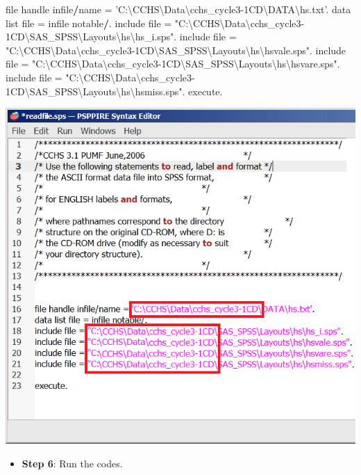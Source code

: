 \documentclass[
]{book}
\newenvironment{Shaded}{\begin{snugshade}}{\end{snugshade}}
\newcommand{\NormalTok}[1]{#1}
\newcommand{\OperatorTok}[1]{\textcolor[rgb]{0.81,0.36,0.00}{\textbf{#1}}}
\newcommand{\StringTok}[1]{\textcolor[rgb]{0.31,0.60,0.02}{#1}}
\providecommand{\tightlist}{%
  \setlength{\itemsep}{0pt}\setlength{\parskip}{0pt}}
\begin{document}
\begin{Shaded}
\begin{Highlighting}[]
\NormalTok{file handle infile}\OperatorTok{/}\NormalTok{name =}\StringTok{ 'C:\textbackslash{}CCHS\textbackslash{}Data\textbackslash{}cchs_cycle3-1CD\textbackslash{}DATA\textbackslash{}hs.txt'}\NormalTok{.}
\NormalTok{data list file =}\StringTok{ }\NormalTok{infile notable}\OperatorTok{/}\NormalTok{.}
\NormalTok{include file =}\StringTok{ "C:\textbackslash{}CCHS\textbackslash{}Data\textbackslash{}cchs_cycle3-1CD\textbackslash{}SAS_SPSS\textbackslash{}Layouts\textbackslash{}hs\textbackslash{}hs_i.sps"}\NormalTok{.}
\NormalTok{include file =}\StringTok{ "C:\textbackslash{}CCHS\textbackslash{}Data\textbackslash{}cchs_cycle3-1CD\textbackslash{}SAS_SPSS\textbackslash{}Layouts\textbackslash{}hs\textbackslash{}hsvale.sps"}\NormalTok{.}
\NormalTok{include file =}\StringTok{ "C:\textbackslash{}CCHS\textbackslash{}Data\textbackslash{}cchs_cycle3-1CD\textbackslash{}SAS_SPSS\textbackslash{}Layouts\textbackslash{}hs\textbackslash{}hsvare.sps"}\NormalTok{.}
\NormalTok{include file =}\StringTok{ "C:\textbackslash{}CCHS\textbackslash{}Data\textbackslash{}cchs_cycle3-1CD\textbackslash{}SAS_SPSS\textbackslash{}Layouts\textbackslash{}hs\textbackslash{}hsmiss.sps"}\NormalTok{.}
\NormalTok{execute.}
\end{Highlighting}
\end{Shaded}

\includegraphics[width=0.65\linewidth]{images/abacus34}

\begin{itemize}
\tightlist
\item
  \textbf{Step 6}: Run the codes.
\end{itemize}
\end{document}
